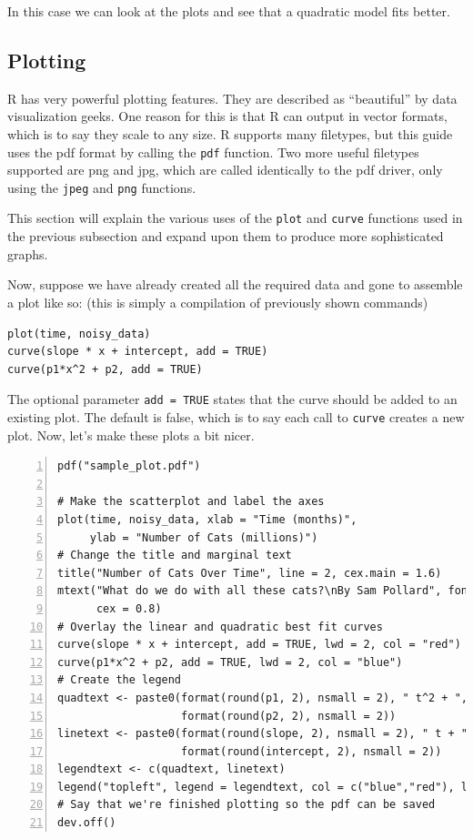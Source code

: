 \documentclass[12pt]{article}
\theoremstyle{remark}
\begin{document}
In this case we can look at the plots and see that a quadratic model fits better.


\subsection{Plotting}\label{plotting}
R has very powerful plotting features. They are described as ``beautiful'' by data visualization geeks. One reason for this is that R can output in vector formats, which is to say they scale to any size. R supports many filetypes, but this guide uses the pdf format by calling the \verb|pdf| function. Two more useful filetypes supported are png and jpg, which are called identically to the pdf driver, only using the \verb|jpeg| and \verb|png| functions.

This section will explain the various uses of the \verb|plot| and \verb|curve| functions used in the previous subsection and expand upon them to produce more sophisticated graphs.

Now, suppose we have already created all the required data and gone to assemble a plot like so: (this is simply a compilation of previously shown commands)
\begin{Verbatim}[frame=single, fontsize=\small]
plot(time, noisy_data)
curve(slope * x + intercept, add = TRUE)
curve(p1*x^2 + p2, add = TRUE)
\end{Verbatim}

The optional parameter \verb|add = TRUE| states that the curve should be added to an existing plot. The default is false, which is to say each call to \verb|curve| creates a new plot. Now, let's make these plots a bit nicer.

\begin{Verbatim}[frame=single, fontsize=\small, numbers=left]
pdf("sample_plot.pdf") 

# Make the scatterplot and label the axes
plot(time, noisy_data, xlab = "Time (months)",
     ylab = "Number of Cats (millions)")
# Change the title and marginal text
title("Number of Cats Over Time", line = 2, cex.main = 1.6)
mtext("What do we do with all these cats?\nBy Sam Pollard", font = 3,
      cex = 0.8)
# Overlay the linear and quadratic best fit curves
curve(slope * x + intercept, add = TRUE, lwd = 2, col = "red")
curve(p1*x^2 + p2, add = TRUE, lwd = 2, col = "blue")
# Create the legend
quadtext <- paste0(format(round(p1, 2), nsmall = 2), " t^2 + ",
                   format(round(p2, 2), nsmall = 2))
linetext <- paste0(format(round(slope, 2), nsmall = 2), " t + ",
                   format(round(intercept, 2), nsmall = 2))
legendtext <- c(quadtext, linetext)
legend("topleft", legend = legendtext, col = c("blue","red"), lwd = c(2,2))
# Say that we're finished plotting so the pdf can be saved
dev.off()
\end{Verbatim}
\end{document}

